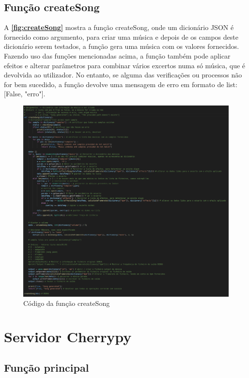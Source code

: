 \documentclass{report}
\begin{document}
\subsection{Função createSong}
\label{ssec:createSong}
A \textbf{\autoref{fig:createSong}} mostra a função createSong, onde um dicionário JSON é fornecido como argumento, para criar
uma música e depois de os campos deste dicionário serem testados, a função gera uma música com os valores fornecidos. Fazendo 
uso das funções mencionadas acima, a função também pode aplicar efeitos e alterar parâmetros para combinar vários excertos
numa só música, que é devolvida ao utilizador. No entanto, se alguma das verificações ou processos não for bem sucedido, a
função devolve uma mensagem de erro em formato de list: [False, "erro"].

\begin{figure}[!h]
\center 
\includegraphics[width=330pt]{img/createSong.png}
\caption{Código da função createSong}
\label{fig:createSong}
\end{figure}
    

\section{Servidor Cherrypy}
\label{sec:serCherrypy}

\subsection{Função principal}
\label{ssec:princfunc}
\end{document}
